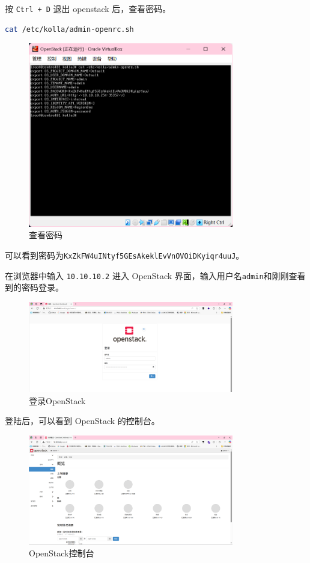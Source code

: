 \documentclass{article}
\begin{document}
按 \texttt{Ctrl + D} 退出 openstack 后，查看密码。

\begin{lstlisting}[language=bash]
    cat /etc/kolla/admin-openrc.sh
\end{lstlisting}

\begin{figure}[H]
    \centering
    \includegraphics[width=0.8\textwidth]{img/7.7.png}
    \caption{查看密码}
\end{figure}

可以看到密码为\texttt{KxZkFW4uINtyf5GEsAkeklEvVnOVOiDKyiqr4uuJ}。

在浏览器中输入 \texttt{10.10.10.2} 进入 OpenStack 界面，输入用户名\texttt{admin}和刚刚查看到的密码登录。

\begin{figure}[H]
    \centering
    \includegraphics[width=0.8\textwidth]{img/7.8.png}
    \caption{登录OpenStack}
\end{figure}

登陆后，可以看到 OpenStack 的控制台。

\begin{figure}[H]
    \centering
    \includegraphics[width=0.8\textwidth]{img/7.9.png}
    \caption{OpenStack控制台}
\end{figure}
\end{document}
